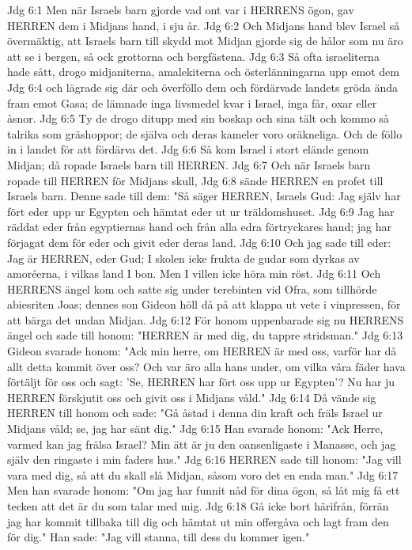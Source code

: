 Jdg 6:1  Men när Israels barn gjorde vad ont var i HERRENS ögon, gav HERREN dem i Midjans hand, i sju år.
Jdg 6:2  Och Midjans hand blev Israel så övermäktig, att Israels barn till skydd mot Midjan gjorde sig de hålor som nu äro att se i bergen, så ock grottorna och bergfästena.
Jdg 6:3  Så ofta israeliterna hade sått, drogo midjaniterna, amalekiterna och österlänningarna upp emot dem
Jdg 6:4  och lägrade sig där och överföllo dem och fördärvade landets gröda ända fram emot Gasa; de lämnade inga livsmedel kvar i Israel, inga får, oxar eller åsnor.
Jdg 6:5  Ty de drogo ditupp med sin boskap och sina tält och kommo så talrika som gräshoppor; de själva och deras kameler voro oräkneliga. Och de föllo in i landet för att fördärva det.
Jdg 6:6  Så kom Israel i stort elände genom Midjan; då ropade Israels barn till HERREN.
Jdg 6:7  Och när Israels barn ropade till HERREN för Midjans skull,
Jdg 6:8  sände HERREN en profet till Israels barn. Denne sade till dem: "Så säger HERREN, Israels Gud: Jag själv har fört eder upp ur Egypten och hämtat eder ut ur träldomshuset.
Jdg 6:9  Jag har räddat eder från egyptiernas hand och från alla edra förtryckares hand; jag har förjagat dem för eder och givit eder deras land.
Jdg 6:10  Och jag sade till eder: Jag är HERREN, eder Gud; I skolen icke frukta de gudar som dyrkas av amoréerna, i vilkas land I bon. Men I villen icke höra min röst.
Jdg 6:11  Och HERRENS ängel kom och satte sig under terebinten vid Ofra, som tillhörde abiesriten Joas; dennes son Gideon höll då på att klappa ut vete i vinpressen, för att bärga det undan Midjan.
Jdg 6:12  För honom uppenbarade sig nu HERRENS ängel och sade till honom: "HERREN är med dig, du tappre stridsman."
Jdg 6:13  Gideon svarade honom: "Ack min herre, om HERREN är med oss, varför har då allt detta kommit över oss? Och var äro alla hans under, om vilka våra fäder hava förtäljt för oss och sagt: 'Se, HERREN har fört oss upp ur Egypten'? Nu har ju HERREN förskjutit oss och givit oss i Midjans våld."
Jdg 6:14  Då vände sig HERREN till honom och sade: "Gå åstad i denna din kraft och fräls Israel ur Midjans våld; se, jag har sänt dig."
Jdg 6:15  Han svarade honom: "Ack Herre, varmed kan jag frälsa Israel? Min ätt är ju den oansenligaste i Manasse, och jag själv den ringaste i min faders hus."
Jdg 6:16  HERREN sade till honom: "Jag vill vara med dig, så att du skall slå Midjan, såsom voro det en enda man."
Jdg 6:17  Men han svarade honom: "Om jag har funnit nåd för dina ögon, så låt mig få ett tecken att det är du som talar med mig.
Jdg 6:18  Gå icke bort härifrån, förrän jag har kommit tillbaka till dig och hämtat ut min offergåva och lagt fram den för dig." Han sade: "Jag vill stanna, till dess du kommer igen."
